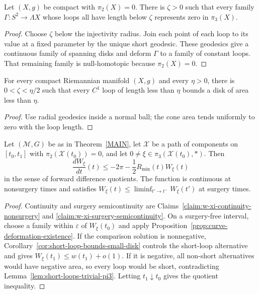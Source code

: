 \begin{lemma}
\label{lem:short-loops-trivial-pi3}
\label{shortpi2triv}
Let $(X,g)$ be compact with $\pi_2(X)=0$. There is $\zeta>0$ such that every
family $\Gamma\colon S^2\to\Lambda X$ whose loops all have length below
$\zeta$ represents zero in $\pi_3(X)$.
\end{lemma}
\begin{proof}
\sketch Choose $\zeta$ below the injectivity radius. Join each point of each
loop to its value at a fixed parameter by the unique short geodesic. These
geodesics give a continuous family of spanning disks and deform $\Gamma$ to a
family of constant loops. That remaining family is null-homotopic because
$\pi_2(X)=0$.
\end{proof}

\begin{corollary}
\label{cor:short-loop-bounds-small-disk}
\label{shlnsharea}

For every compact Riemannian manifold $(X,g)$ and every $\eta>0$, there is
$0<\zeta<\eta/2$ such that every $C^1$ loop of length less than $\eta$ bounds
a disk of area less than $\eta$.
\end{corollary}
\begin{proof}
\sketch Use radial geodesics inside a normal ball; the cone area tends
uniformly to zero with the loop length.
\end{proof}

\begin{proposition}
\label{prop:w3-forward-difference-quotient}
\label{W_3fordiff}

Let $({\mathcal M},G)$ be as in Theorem~\ref{MAIN}, let ${\mathcal X}$ be a
path of components on $[t_0,t_1]$ with
$\pi_2({\mathcal X}(t_0))=0$, and let
$0\ne\xi\in\pi_3({\mathcal X}(t_0),*)$. Then
\[
\frac{dW_\xi}{dt}(t)\le-2\pi-\frac12R_{\min}(t)W_\xi(t)
\]
in the sense of forward difference quotients. The function is continuous at
nonsurgery times and satisfies
$W_\xi(t)\le\liminf_{t'\to t^-}W_\xi(t')$ at surgery times.
\end{proposition}
\begin{proof}
\sketch Continuity and surgery semicontinuity are
Claims~\ref{claim:w-xi-continuity-nonsurgery} and
\ref{claim:w-xi-surgery-semicontinuity}. On a surgery-free interval, choose a
family within $\varepsilon$ of $W_\xi(t_0)$ and apply
Proposition~\ref{prop:curve-deformation-existence}. If the comparison solution
is nonnegative, Corollary~\ref{cor:short-loop-bounds-small-disk} controls the
short-loop alternative and gives $W_\xi(t_1)\le w(t_1)+o(1)$. If it is
negative, all non-short alternatives would have negative area, so every loop
would be short, contradicting Lemma~\ref{lem:short-loops-trivial-pi3}. Letting
$t_1\downarrow t_0$ gives the quotient inequality.
\end{proof}

